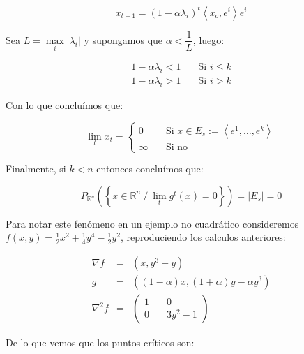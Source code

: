 \documentclass[11pt]{book}
\newcommand{\R}{{\mathbb{R}}}
\newcommand{\abs}[1]{\left\lvert#1\right\rvert}
\newcommand{\ip}[1]{\left\langle#1\right\rangle}
\newcommand{\sett}[1]{\left\lbrace#1\right\rbrace}
\numberwithin{theorem}{subsection}
\begin{document}
\begin{equation*}
x_{t+1} = \left(1 - \alpha\lambda_i\right)^t\ip{x_o, e^i}e^i
\end{equation*}

Sea $L = \max\limits_i\abs{\lambda_i}$ y supongamos que $\alpha < \dfrac{1}{L}$, luego:

\begin{equation*}
\begin{aligned}
1 - \alpha \lambda_i < 1 & \quad \text{Si } i \leq k \\
1 - \alpha \lambda_i > 1 & \quad \text{Si } i > k 
\end{aligned}
\end{equation*}

Con lo que conclu\'imos que:

\begin{equation*}
\lim\limits_t x_t = \left\lbrace{
	\begin{aligned}
		0 & \quad \text{Si } x \in E_s := \ip{e^1, \dots, e^k} \\
		\infty & \quad \text{Si no} 
	\end{aligned}
	}\right.
\end{equation*}

Finalmente, si $k < n$ entonces conclu\'imos que:

\begin{equation*}
P_{\R^n}(\sett{x \in \R^n \ / \ \lim\limits_t g^t(x) = 0}) = \abs{E_s} = 0
\end{equation*}

\medskip

Para notar este fen\'omeno en un ejemplo no cuadr\'atico consideremos $f(x, y) = \frac{1}{2}x^2 + \frac{1}{4}y^4 - \frac{1}{2}y^2$, reproduciendo los calculos anteriores:

\begin{equation}
\label{gradient descent ejemplo 2}
\begin{aligned}
\nabla f & = & \left(x, y^3 -y\right) \\
g & = & \left((1-\alpha)x, (1+\alpha)y - \alpha y^3\right) \\
\nabla^2 f & = & \left(
	\begin{aligned}
		1 & \quad 0 \\
		0 & \quad 3y^2-1
	\end{aligned}
\right) 
\end{aligned}
\end{equation}

De lo que vemos que los puntos cr\'iticos son:
\end{document}
